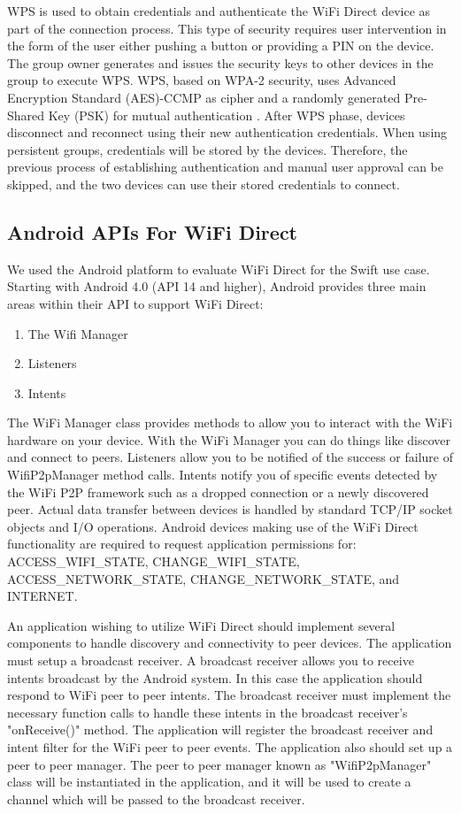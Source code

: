 \documentclass[10pt,twocolumn]{article}
\begin{document}
WPS is used to obtain credentials and authenticate the WiFi Direct device as part of the connection process.  
This type of security requires user intervention in the form of the user either pushing a button or providing a PIN on the device.
The group owner generates and issues the security keys to other devices in the group to execute WPS. 
WPS, based on WPA-2 security, uses Advanced Encryption Standard (AES)-CCMP as cipher and a randomly generated Pre-Shared Key (PSK) for mutual authentication \cite{wifiwhitepaper}.
After WPS phase, devices disconnect and reconnect using their new authentication credentials.
When using persistent groups, credentials will be stored by the devices.
Therefore, the previous process of establishing authentication and manual user approval can be skipped, and the two devices can use their stored credentials to connect.

\subsection{Android APIs For WiFi Direct}
\label{sec:Android APIs For WiFi Direct}
We used the Android platform to evaluate WiFi Direct for the Swift use case.
Starting with Android 4.0 (API 14 and higher), Android provides three main areas within their API to support WiFi Direct:
\begin{enumerate}
\item The Wifi Manager 
\item Listeners 
\item Intents
\end{enumerate}
The WiFi Manager class provides methods to allow you to interact with the WiFi hardware on your device.
With the WiFi Manager you can do things like discover and connect to peers. 
Listeners allow you to be notified of the success or failure of WifiP2pManager method calls. 
Intents notify you of specific events detected by the WiFi P2P framework such as a dropped connection or a newly discovered peer. 
Actual data transfer between devices is handled by standard TCP/IP socket objects and I/O operations.
Android devices making use of the WiFi Direct functionality are required to request application permissions for: ACCESS\_WIFI\_STATE, CHANGE\_WIFI\_STATE, ACCESS\_NETWORK\_STATE, CHANGE\_NETWORK\_STATE, and INTERNET. \cite{androidoverview}

An application wishing to utilize WiFi Direct should implement several components to handle discovery and connectivity to peer devices.
The application must setup a broadcast receiver. 
A broadcast receiver allows you to receive intents broadcast by the Android system. 
In this case the application should respond to WiFi peer to peer intents.
The broadcast receiver must implement the necessary function calls to handle these intents in the broadcast receiver's "onReceive()" method.
The application will register the broadcast receiver and intent filter for the WiFi peer to peer events.
The application also should set up a peer to peer manager. 
The peer to peer manager known as "WifiP2pManager" class will be instantiated in the application, and it will be used to create a channel which will be passed to the broadcast receiver.
\end{document}
